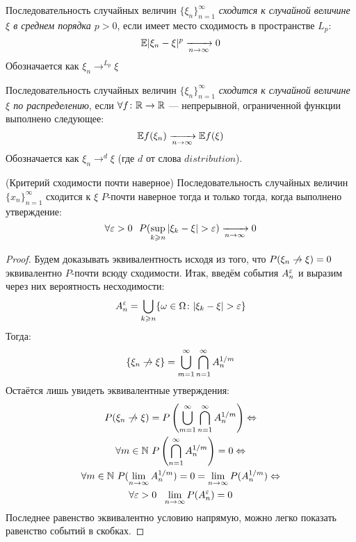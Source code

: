 \begin{definition}
	Последовательность случайных величин $\{\xi_n\}_{n = 1}^\infty$ \textit{сходится к случайной величине $\xi$ в среднем порядка $p > 0$}, если имеет место сходимость в пространстве $L_p$:
	\[
		\mathbb{E}|\xi_n - \xi|^p \xrightarrow[n \to \infty]{} 0
	\]
	Обозначается как $\xi_n \to^{L_p} \xi$
\end{definition}

\begin{definition}
	Последовательность случайных величин $\{\xi_n\}_{n = 1}^\infty$ \textit{сходится к случайной величине $\xi$ по распределению}, если $\forall f \colon \mathbb{R} \to \mathbb{R}$ --- непрерывной, ограниченной функции выполнено следующее:
	\[
		\mathbb{E} f(\xi_n) \xrightarrow[n \to \infty]{
		} \mathbb{E} f(\xi)
	\]
	Обозначается как $\xi_n \to^d \xi$ (где $d$ от слова $distribution$).
\end{definition}

\begin{theorem} (Критерий сходимости почти наверное)
	Последовательность случайных величин $\{x_n\}_{n = 1}^\infty$ сходится к $\xi$ $P$-почти наверное тогда и только тогда, когда выполнено утверждение:
	\[
		\forall \varepsilon > 0\ \ P(\sup_{k \geqslant n} |\xi_k - \xi| > \varepsilon) \xrightarrow[n \to \infty]{} 0
	\]
\end{theorem}

\begin{proof}
	Будем доказывать эквивалентность исходя из того, что $P(\xi_n \centernot\to \xi) = 0$ эквивалентно $P$-почти всюду сходимости. Итак, введём события $A_n^{\varepsilon}$ и выразим через них вероятность несходимости:
	\[
		A_n^{\varepsilon} = \bigcup_{k \geqslant n} \{\omega \in \Omega \colon |\xi_k - \xi| > \varepsilon\}
	\]
	Тогда:
	\[
		\{\xi_n \centernot\to \xi\} = \bigcup_{m = 1}^\infty \bigcap_{n = 1}^\infty A_n^{1 / m}
	\]
	Остаётся лишь увидеть эквивалентные утверждения:
	\begin{multline*}
		P(\xi_n \centernot\to \xi) = P\ps{\bigcup_{m = 1}^\infty \bigcap_{n = 1}^\infty A_n^{1 / m}} \Lra
		\\
		\forall m \in \N\  P\ps{\bigcap_{n = 1}^\infty A_n^{1 / m}} = 0 \Lra
		\\
		\forall m \in \N\ P(\lim_{n \to \infty} A_n^{1 / m}) = 0 = \lim_{n \to \infty} P(A_n^{1 / m}) \Lra
		\\
		\forall \eps > 0\ \ \lim_{n \to \infty} P(A_n^\eps) = 0
	\end{multline*}
	Последнее равенство эквивалентно условию напрямую, можно легко показать равенство событий в скобках.
\end{proof}


